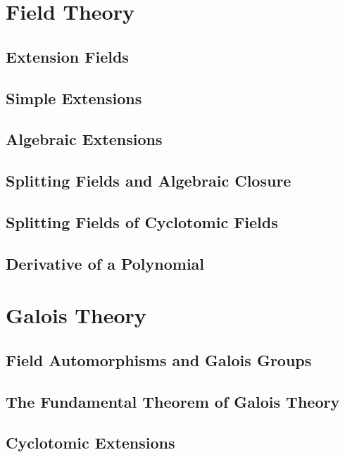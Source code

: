 \documentclass[a4paper, openany]{book}
\begin{document}
\chapter{Field Theory}
\section{Extension Fields}

\newpage

\section{Simple Extensions}

\newpage

\section{Algebraic Extensions}

\newpage

\section{Splitting Fields and Algebraic Closure}

\newpage

\section{Splitting Fields of Cyclotomic Fields}

\newpage

\section{Derivative of a Polynomial}

\newpage

\chapter{Galois Theory}
\section{Field Automorphisms and Galois Groups}

\newpage

\section{The Fundamental Theorem of Galois Theory}

\newpage

\section{Cyclotomic Extensions}

\end{document}
